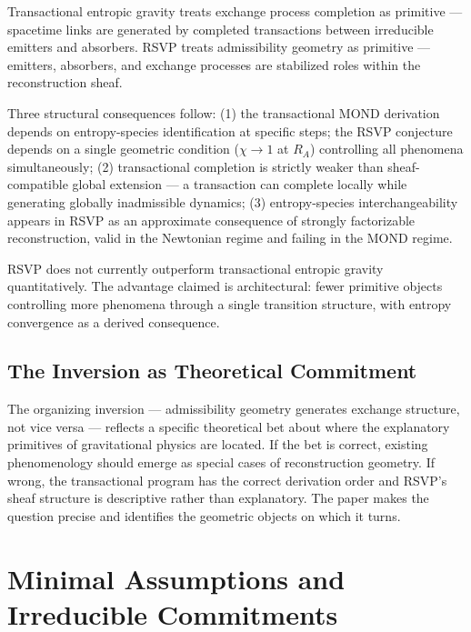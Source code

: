 \documentclass[11pt, a4paper]{article}
\theoremstyle{plain}
\theoremstyle{definition}
\theoremstyle{remark}
\newcommand{\RA}{R_{\!A}}
\begin{document}
Transactional entropic gravity treats exchange process completion as primitive ---
spacetime links are generated by completed transactions between irreducible emitters
and absorbers. RSVP treats admissibility geometry as primitive --- emitters,
absorbers, and exchange processes are stabilized roles within the reconstruction
sheaf.

Three structural consequences follow: (1) the transactional MOND derivation depends
on entropy-species identification at specific steps; the RSVP conjecture depends on a
single geometric condition ($\chi \to 1$ at $\RA$) controlling all phenomena
simultaneously; (2) transactional completion is strictly weaker than sheaf-compatible
global extension --- a transaction can complete locally while generating globally
inadmissible dynamics; (3) entropy-species interchangeability appears in RSVP as an
approximate consequence of strongly factorizable reconstruction, valid in the
Newtonian regime and failing in the MOND regime.

RSVP does not currently outperform transactional entropic gravity quantitatively. The
advantage claimed is architectural: fewer primitive objects controlling more phenomena
through a single transition structure, with entropy convergence as a derived
consequence.

\subsection{The Inversion as Theoretical Commitment}

The organizing inversion --- admissibility geometry generates exchange structure, not
vice versa --- reflects a specific theoretical bet about where the explanatory
primitives of gravitational physics are located. If the bet is correct, existing
phenomenology should emerge as special cases of reconstruction geometry. If wrong,
the transactional program has the correct derivation order and RSVP's sheaf structure
is descriptive rather than explanatory. The paper makes the question precise and
identifies the geometric objects on which it turns.

\section{Minimal Assumptions and Irreducible Commitments}
\label{sec:assumptions}
\end{document}
